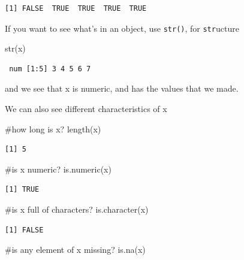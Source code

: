 \documentclass[
  letterpaper,
  DIV=11,
  numbers=noendperiod]{scrreprt}
\newenvironment{Shaded}{\begin{snugshade}}{\end{snugshade}}
\newcommand{\CommentTok}[1]{\textcolor[rgb]{0.37,0.37,0.37}{#1}}
\newcommand{\FunctionTok}[1]{\textcolor[rgb]{0.28,0.35,0.67}{#1}}
\newcommand{\NormalTok}[1]{\textcolor[rgb]{0.00,0.23,0.31}{#1}}
\begin{document}
\begin{verbatim}
[1] FALSE  TRUE  TRUE  TRUE  TRUE
\end{verbatim}

If you want to see what's in an object, use \texttt{str()}, for
\texttt{str}ucture

\begin{Shaded}
\begin{Highlighting}[]
\FunctionTok{str}\NormalTok{(x)}
\end{Highlighting}
\end{Shaded}

\begin{verbatim}
 num [1:5] 3 4 5 6 7
\end{verbatim}

and we see that x is numeric, and has the values that we made.

We can also see different characteristics of x

\begin{Shaded}
\begin{Highlighting}[]
\CommentTok{\#how long is x?}
\FunctionTok{length}\NormalTok{(x)}
\end{Highlighting}
\end{Shaded}

\begin{verbatim}
[1] 5
\end{verbatim}

\begin{Shaded}
\begin{Highlighting}[]
\CommentTok{\#is x numeric?}
\FunctionTok{is.numeric}\NormalTok{(x)}
\end{Highlighting}
\end{Shaded}

\begin{verbatim}
[1] TRUE
\end{verbatim}

\begin{Shaded}
\begin{Highlighting}[]
\CommentTok{\#is x full of characters?}
\FunctionTok{is.character}\NormalTok{(x)}
\end{Highlighting}
\end{Shaded}

\begin{verbatim}
[1] FALSE
\end{verbatim}

\begin{Shaded}
\begin{Highlighting}[]
\CommentTok{\#is any element of x missing?}
\FunctionTok{is.na}\NormalTok{(x)}
\end{Highlighting}
\end{Shaded}
\end{document}
